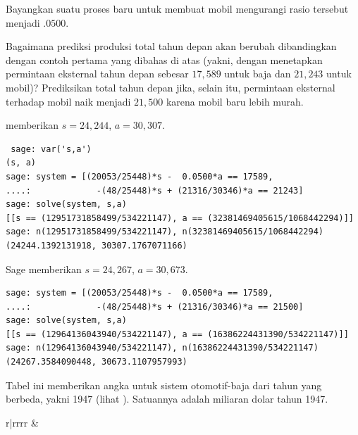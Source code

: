\begin{exercises}
    Bayangkan suatu proses baru untuk membuat mobil mengurangi
    rasio tersebut menjadi $.0500$.
    \begin{exparts}
      \partsitem Bagaimana prediksi produksi total tahun depan akan
        berubah dibandingkan dengan contoh pertama yang dibahas
        di atas (yakni, dengan menetapkan permintaan eksternal tahun depan
        sebesar $17,589$ untuk baja dan $21,243$ untuk mobil)?
      \partsitem Prediksikan total tahun depan jika, selain itu,
        permintaan eksternal terhadap
        mobil naik menjadi $21,500$ karena mobil baru lebih murah.
    \end{exparts}
    \begin{answer}
      \begin{exparts}
        \partsitem \Sage{} memberikan $s=24,244$, $a=30,307$.
\begin{lstlisting}
 sage: var('s,a')
(s, a)
sage: system = [(20053/25448)*s -  0.0500*a == 17589,
....:             -(48/25448)*s + (21316/30346)*a == 21243]
sage: solve(system, s,a)
[[s == (12951731858499/534221147), a == (32381469405615/1068442294)]]
sage: n(12951731858499/534221147), n(32381469405615/1068442294)
(24244.1392131918, 30307.1767071166)         
\end{lstlisting}
        \partsitem Sage memberikan $s=24,267$, $a=30,673$.
\begin{lstlisting}
sage: system = [(20053/25448)*s -  0.0500*a == 17589,
....:             -(48/25448)*s + (21316/30346)*a == 21500]
sage: solve(system, s,a)
[[s == (12964136043940/534221147), a == (16386224431390/534221147)]]
sage: n(12964136043940/534221147), n(16386224431390/534221147)
(24267.3584090448, 30673.1107957993)          
\end{lstlisting}
      \end{exparts}
    \end{answer}
  \item
    Tabel ini memberikan angka untuk sistem otomotif-baja dari
    tahun yang berbeda, yakni 1947 (lihat \cite{Leontief1951}).
    Satuannya adalah miliaran dolar tahun 1947.
    \begin{center}
      \begin{tabular}{r|rrrr}
             &

\end{tabular}
\end{center}
\end{exercises}
